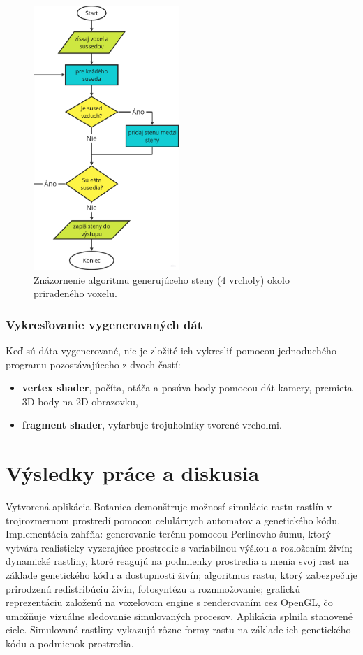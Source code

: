 \documentclass[12pt]{article}
\begin{document}
\begin{figure}[ht]
	\centering
	\includegraphics[height=10cm]{res/diagram_generovanie_voxelov.png}
	\caption{Znázornenie algoritmu generujúceho steny (4 vrcholy) okolo priradeného voxelu.}
	\label{obr:diagram algoritmu generujuceho vertexy}
\end{figure}

\subsubsection{Vykresľovanie vygenerovaných dát}

Keď sú dáta vygenerované, nie je zložité ich vykresliť pomocou jednoduchého
programu pozostávajúceho z dvoch častí:

\begin{itemize}
	\item \textbf{vertex shader}, počíta, otáča a posúva body pomocou dát kamery,
	      premieta 3D body na 2D obrazovku,
	\item \textbf{fragment shader}, vyfarbuje trojuholníky tvorené vrcholmi.
\end{itemize}


\section{Výsledky práce a diskusia}

Vytvorená aplikácia Botanica demonštruje možnosť simulácie rastu rastlín
v trojrozmernom prostredí pomocou celulárnych automatov a genetického kódu.
Implementácia zahŕňa: generovanie terénu pomocou Perlinovho šumu, ktorý vytvára
realisticky vyzerajúce prostredie s variabilnou výškou a rozložením živín;
dynamické rastliny, ktoré reagujú na podmienky prostredia a menia svoj rast
na základe genetického kódu a dostupnosti živín; algoritmus rastu, ktorý
zabezpečuje prirodzenú redistribúciu živín, fotosyntézu a rozmnožovanie;
grafickú reprezentáciu založenú na voxelovom engine s renderovaním cez OpenGL,
čo umožňuje vizuálne sledovanie simulovaných procesov. Aplikácia splnila
stanovené ciele. Simulované rastliny vykazujú rôzne formy rastu na základe
ich genetického kódu a podmienok prostredia.
\end{document}
